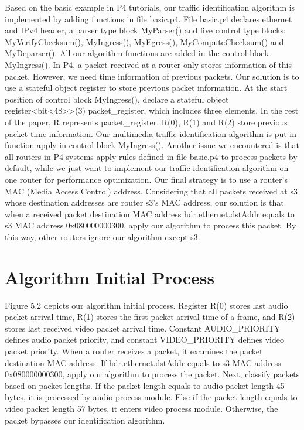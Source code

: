 \documentclass[master]{thesis}
\begin{document}
Based on the basic example in P4 tutorials, our traffic identification algorithm is implemented by adding functions in file basic.p4. File basic.p4 declares ethernet and IPv4 header, a parser type block MyParser() and five control type blocks:  MyVerifyChecksum(), MyIngress(), MyEgress(), MyComputeChecksum() and MyDeparser().  All our algorithm functions are added in the control block MyIngress(). In P4, a packet received at a router only stores information of this packet. However, we need time information of previous packets. Our solution is to use a stateful object register to store previous packet information. At the start position of control block MyIngress(), declare a stateful object register<bit<48>>(3) packet\_register, which includes three elements. In the rest of the paper, R represents packet\_register. R(0), R(1) and R(2) store previous packet time information. Our multimedia traffic identification algorithm is put in function apply{} in control block MyIngress(). Another issue we encountered is that all routers in P4 systems apply rules defined in file basic.p4 to process packets by default, while we just want to implement our traffic identification algorithm on one router for performance optimization. Our final strategy is to use a router’s MAC (Media Access Control) address. Considering that all packets received at s3 whose destination addresses are router s3’s MAC address, our solution is that when a received packet destination MAC address hdr.ethernet.dstAddr equals to s3 MAC address 0x080000000300, apply our algorithm to process this packet. By this way, other routers ignore our algorithm except s3. 

\section{Algorithm Initial Process}

Figure 5.2 depicts our algorithm initial process. Register R(0) stores last audio packet arrival time, R(1) stores the first packet arrival time of a frame, and R(2) stores last received video packet arrival time. Constant AUDIO\_PRIORITY defines audio packet priority, and constant VIDEO\_PRIORITY defines video packet priority. When a router receives a packet, it examines the packet destination MAC address. If hdr.ethernet.dstAddr equals to s3 MAC address 0x080000000300, apply our algorithm to process the packet. Next, classify packets based on packet lengths. If the packet length equals to audio packet length 45 bytes, it is processed by audio process module. Else if the packet length equals to video packet length 57 bytes, it enters video process module. Otherwise, the packet bypasses our identification algorithm. 
\end{document}
